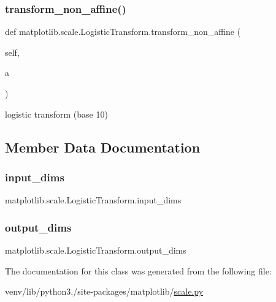 \subsubsection{\texorpdfstring{transform\+\_\+non\+\_\+affine()}{transform\_non\_affine()}}
{\footnotesize\ttfamily def matplotlib.\+scale.\+Logistic\+Transform.\+transform\+\_\+non\+\_\+affine (\begin{DoxyParamCaption}\item[{}]{self,  }\item[{}]{a }\end{DoxyParamCaption})}

\begin{DoxyVerb}logistic transform (base 10)\end{DoxyVerb}
 

\subsection{Member Data Documentation}
\mbox{\label{classmatplotlib_1_1scale_1_1LogisticTransform_ad42f459ca4c63d1e1b24443c72096ef2}} 
\subsubsection{\texorpdfstring{input\+\_\+dims}{input\_dims}}
{\footnotesize\ttfamily matplotlib.\+scale.\+Logistic\+Transform.\+input\+\_\+dims\hspace{0.3cm}{\ttfamily [static]}}

\mbox{\label{classmatplotlib_1_1scale_1_1LogisticTransform_ae674f134aaf887898152fd181a640f20}} 
\subsubsection{\texorpdfstring{output\+\_\+dims}{output\_dims}}
{\footnotesize\ttfamily matplotlib.\+scale.\+Logistic\+Transform.\+output\+\_\+dims\hspace{0.3cm}{\ttfamily [static]}}



The documentation for this class was generated from the following file\+:\begin{DoxyCompactItemize}
\item 
venv/lib/python3./site-\/packages/matplotlib/\hyperlink{scale_8py}{scale.\+py}\end{DoxyCompactItemize}

